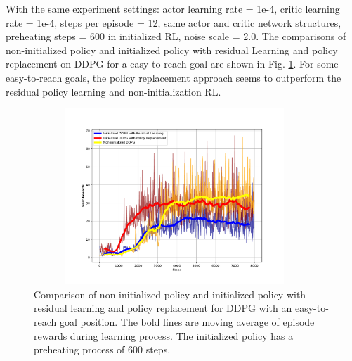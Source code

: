 \documentclass{article}
\begin{document}
With the same experiment settings: actor learning rate = 1e-4, critic learning rate = 1e-4, steps per episode = 12, same actor and critic network structures, preheating steps = 600 in initialized RL, noise scale = 2.0. The comparisons of non-initialized policy and initialized policy with residual Learning and policy replacement on DDPG for a easy-to-reach goal are shown in Fig. \ref{fig:rpl2}. For some easy-to-reach goals, the policy replacement approach seems to outperform the residual policy learning and non-initialization RL.
\begin{figure}[htbp]
	\centering
	\includegraphics[height=250, width=400]{img/res_ddpg3.pdf}
	\caption{Comparison of non-initialized policy and initialized policy with residual learning and policy replacement for DDPG with an easy-to-reach goal position. The bold lines are moving average of episode rewards during learning process. The initialized policy has a preheating process of 600 steps.}
	\label{fig:rpl2}
\end{figure}
\end{document}
